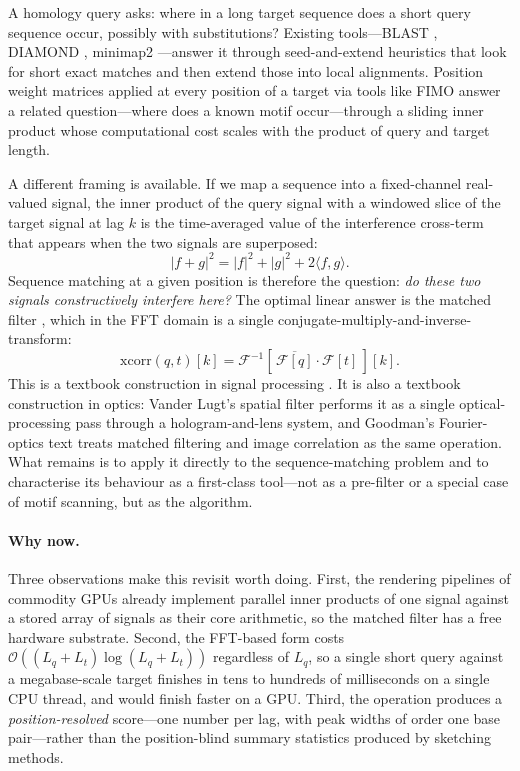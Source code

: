 \documentclass[11pt,a4paper]{article}
\theoremstyle{definition}
\theoremstyle{remark}
\newcommand{\bigO}{\mathcal{O}}
\newcommand{\F}{\mathcal{F}}
\begin{document}
A homology query asks: where in a long target sequence does a short query
sequence occur, possibly with substitutions? Existing tools---BLAST
\citep{altschul1990, altschul1997}, DIAMOND \citep{buchfink2015},
minimap2 \citep{li2018}---answer it through seed-and-extend heuristics
that look for short exact matches and then extend those into local
alignments. Position weight matrices \citep{stormo2000, schneider1986}
applied at every position of a target via tools like FIMO
\citep{grant2011} answer a related question---where does a known motif
occur---through a sliding inner product whose computational cost scales
with the product of query and target length.

A different framing is available. If we map a sequence into a
fixed-channel real-valued signal, the inner product of the query
signal with a windowed slice of the target signal at lag $k$ is the
time-averaged value of the interference cross-term that appears when the
two signals are superposed:
\begin{equation}
    | f + g |^2 = | f |^2 + | g |^2 + 2 \langle f, g \rangle.
    \label{eq:interference}
\end{equation}
Sequence matching at a given position is therefore the question:
\emph{do these two signals constructively interfere here?} The optimal
linear answer is the matched filter \citep{turin1960, north1963}, which
in the FFT domain is a single conjugate-multiply-and-inverse-transform:
\begin{equation}
    \mathrm{xcorr}(q, t)[k] = \F^{-1}\!\left[\, \overline{\F[q]} \cdot \F[t] \,\right]\![k].
    \label{eq:fft_xcorr}
\end{equation}
This is a textbook construction in signal processing
\citep{vantrees2001, kay1998, oppenheim2009}. It is also a textbook
construction in optics: Vander Lugt's spatial filter
\citep{vanderlugt1964} performs it as a single optical-processing pass
through a hologram-and-lens system, and Goodman's Fourier-optics text
\citep{goodman2005} treats matched filtering and image correlation as
the same operation. What remains is to apply it directly to the
sequence-matching problem and to characterise its behaviour as a
first-class tool---not as a pre-filter or a special case of motif
scanning, but as the algorithm.

\paragraph{Why now.} Three observations make this revisit worth doing.
First, the rendering pipelines of commodity GPUs already implement
parallel inner products of one signal against a stored array of
signals as their core arithmetic, so the matched filter has a free
hardware substrate. Second, the FFT-based form costs
$\bigO((L_q + L_t) \log(L_q + L_t))$ regardless of $L_q$, so a single
short query against a megabase-scale target finishes in tens to
hundreds of milliseconds on a single CPU thread, and would
finish faster on a GPU. Third, the operation produces a
\emph{position-resolved} score---one number per lag, with peak widths
of order one base pair---rather than the position-blind summary
statistics produced by sketching methods.
\end{document}
